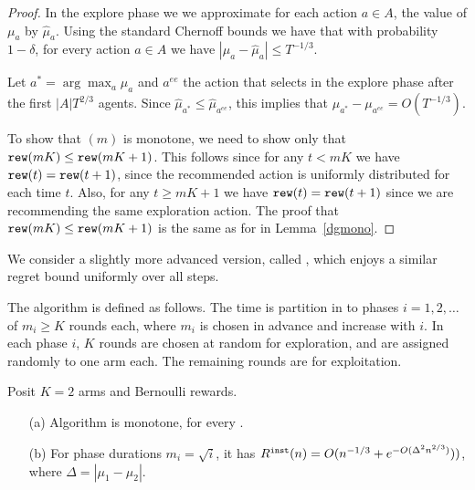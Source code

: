 \begin{proof}
In the explore phase we we approximate for each action $a\in A$, the
value of $\mu_a$ by $\hat{\mu}_a$. Using the standard Chernoff
bounds we have that with probability $1-\delta$, for every action
$a\in A$ we have $|\mu_a -\hat{\mu}_a| \leq T^{-1/3}$.

Let $a^* = \arg\max_a \mu_a$ and $a^{ee}$ the action that
\ExplorExploit selects in the explore phase after the first
$|A|T^{2/3}$ agents. Since $\hat{\mu}_{a^*} \leq
\hat{\mu}_{a^{ee}}$, this implies that $\mu_{a^*} -
\mu_{a^{ee}}=O(T^{-1/3})$.

To show that \ExplorExploit$(m)$ is monotone, we need to show only
that $\mathtt{rew}(mK) \leq \mathtt{rew}(mK+1)$. This follows since for any $t< mK$
we have $\mathtt{rew}(t)=\mathtt{rew}(t+1)$, since the recommended action is
uniformly distributed for each time $t$. Also, for any $t\geq mK+1$
we have $\mathtt{rew}(t)=\mathtt{rew}(t+1)$ since we are recommending the same
exploration action. The proof that $\mathtt{rew}(mK) \leq \mathtt{rew}(mK+1)$ is the
same as for \DynGreedy in Lemma~\ref{dgmono}.
\end{proof}

We consider a slightly more advanced version, called \PhasedExplorExploit, which enjoys a similar regret bound uniformly over all steps.

The algorithm is defined as follows. The time is partition in to phases $i = 1,2, \ldots $ of $m_i\geq K$ rounds each, where $m_i$ is chosen in advance and increase with $i$. In each phase $i$, $K$ rounds are chosen at random for exploration, and are assigned randomly to one arm each. The remaining rounds are for exploitation. 

\begin{lemma}
Posit $K=2$ arms and Bernoulli rewards. 
\begin{itemize}
\item[(a)] Algorithm \PhasedExplorExploit is monotone, for every \MRV.

\item[(b)] For phase durations $m_i =\sqrt{i}$, it has 
    $R^{\mathtt{inst}}(n)=O(n^{-1/3}+e^{-O(\Delta^2 n^{2/3})}))$,
where $\Delta = |\mu_1-\mu_2|$.
\end{itemize}
\end{lemma}

